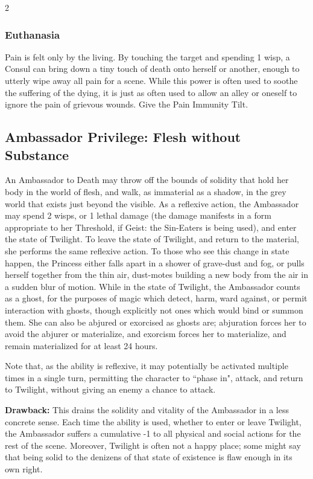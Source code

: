 \begin{multicols}{2}
\subsubsection*{Euthanasia}

Pain is felt only by the living. By touching the target and spending 1 wisp, a Consul can bring down a tiny touch of death onto herself or another, enough to utterly wipe away all pain for a scene. While this power is often used to soothe the suffering of the dying, it is just as often used to allow an alley or oneself to ignore the pain of grievous wounds. Give the Pain Immunity Tilt. 

\subsection*{Ambassador Privilege: Flesh without Substance}

An Ambassador to Death may throw off the bounds of solidity that hold her body in the world of flesh, and walk, as immaterial as a shadow, in the grey world that exists just beyond the visible. As a reflexive action, the Ambassador may spend 2 wisps, or 1 lethal damage (the damage manifests in a form appropriate to her Threshold, if Geist: the Sin-Eaters is being used), and enter the state of Twilight. To leave the state of Twilight, and return to the material, she performs the same reflexive action. To those who see this change in state happen, the Princess either falls apart in a shower of grave-dust and fog, or pulls herself together from the thin air, dust-motes building a new body from the air in a sudden blur of motion. While in the state of Twilight, the Ambassador counts as a ghost, for the purposes of magic which detect, harm, ward against, or permit interaction with ghosts, though explicitly not ones which would bind or summon them. She can also be abjured or exorcised as ghosts are; abjuration 
forces her to avoid the abjurer or materialize, and exorcism forces her to materialize, and remain materialized for at least 24 hours.

Note that, as the ability is reflexive, it may potentially be activated multiple times in a single turn, permitting the character to \textquotedblleft phase in", attack, and return to Twilight, without giving an enemy a chance to attack.

\textbf{Drawback:} This drains the solidity and vitality of the Ambassador in a less concrete sense. Each time the ability is used, whether to enter or leave Twilight, the Ambassador suffers a cumulative -1 to all physical and social actions for the rest of the scene. Moreover, Twilight is often not a happy place; some might say that being solid to the denizens of that state of existence is flaw enough in its own right.


\end{multicols}

